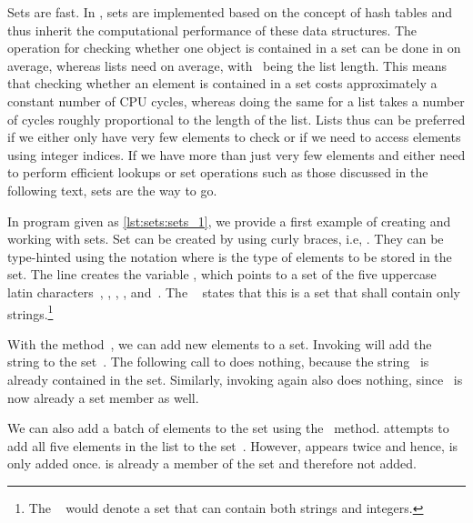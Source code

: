 Sets are fast.
In \python, sets are implemented based on the concept of hash tables and thus inherit the computational performance of these data structures.
The operation for checking whether one object is contained in a set can be done in  on average, whereas lists need \bigOb{\scale} on average, with \scale~being the list length.
This means that checking whether an element is contained in a set costs approximately a constant number of CPU cycles, whereas doing the same for a list takes a number of cycles roughly proportional to the length of the list.
Lists thus can be preferred if we either only have very few elements to check or if we need to access elements using integer indices.
If we have more than just very few elements and either need to perform efficient lookups or set operations such as those discussed in the following text, sets are the way to go.%
%
\begin{sloppypar}%
In program  given as \cref{lst:sets:sets_1}, we provide a first example of creating and working with sets.
Set  can be created by using curly braces, i.e, .
They can be type-hinted using the notation  where  is the type of elements to be stored in the set.
The line  creates the variable , which points to a set of the five uppercase latin characters~, , , , and~.
The ~ states that this is a set that shall contain only strings.\footnote{%
The ~ would denote a set that can contain both strings and integers.%
}%
\end{sloppypar}%
%
With the method~, we can add new elements to a set.
Invoking  will add the string  to the set~.
The following call to  does nothing, because the string~ is already contained in the set.
Similarly, invoking  again also does nothing, since~ is now already a set member as well.%
%
\begin{sloppypar}%
We can also add a batch of elements to the set using the ~method.
 attempts to add all five elements in the list \pythonil{["K", "G", "W", "Q", "W"]} to the set~.
However,  appears twice and hence, is only added once.
 is already a member of the set and therefore not added.%
\end{sloppypar}%
